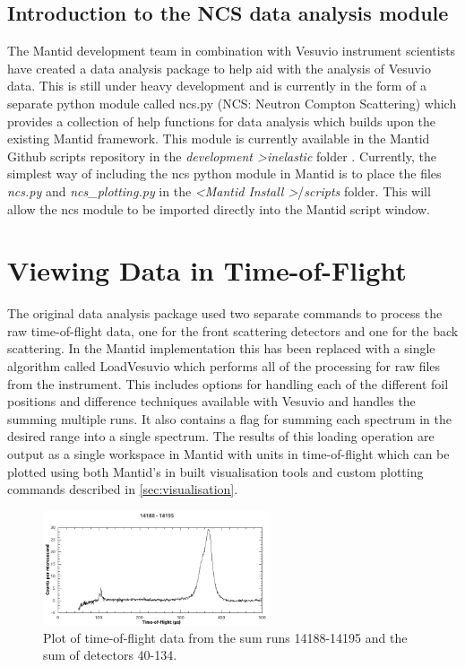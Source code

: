 \documentclass[paper=a4, fontsize=11pt]{scrartcl}	%
\numberwithin{equation}{section}															%
\numberwithin{figure}{section}																%
\numberwithin{table}{section}
\begin{document}
\subsection{Introduction to the NCS data analysis module}
\label{subsec:intro-data-analysis}
The Mantid development team in combination with Vesuvio instrument scientists have created a data analysis package to help aid with the analysis of Vesuvio data. This is still under heavy development and is currently in the form of a separate python module called ncs.py (NCS: Neutron Compton Scattering) which provides a collection of help functions for data analysis which builds upon the existing Mantid framework. This module is currently available in the Mantid Github scripts repository in the \textit{development \textgreater  inelastic} folder \cite{mantidgithubncs}. Currently, the simplest way of including the ncs python module in Mantid is to place the files \textit{ncs.py} and \textit{ncs\_plotting.py} in the \textit{ \textless Mantid Install \textgreater }/\textit{scripts} folder. This will allow the ncs module to be imported directly into the Mantid script window.

\section{Viewing Data in Time-of-Flight}
\label{sec:viewtof}
The original data analysis package \cite{mayers2010user} used two separate commands to process the raw time-of-flight data, one for the front scattering detectors and one for the back scattering. In the Mantid implementation this has been replaced with a single algorithm called LoadVesuvio which performs all of the processing for raw files from the instrument. This includes options for handling each of the different foil positions and difference techniques available with Vesuvio \citep{schooneveld2006foil, mayers2004vesuvio} and handles the summing multiple runs. It also contains a flag for summing each spectrum in the desired range into a single spectrum. The results of this loading operation are output as a single workspace in Mantid with units in time-of-flight which can be plotted using both Mantid's in built visualisation tools and custom plotting commands described in \ref{sec:visualisation}.

\begin{figure}[H]
\centering
\includegraphics[width=0.6\textwidth]{img/tof-spectrum.png}
\caption{Plot of time-of-flight data from the sum runs 14188-14195 and the sum of detectors 40-134.}
\label{fig:tof-spectrum}
\end{figure}
\end{document}
